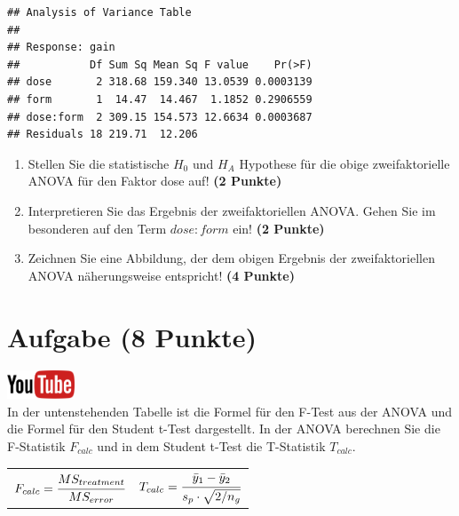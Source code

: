 \documentclass[a4paper, 10pt]{scrartcl}\usepackage[]{graphicx}\usepackage[]{xcolor}
\makeatletter
\newenvironment{kframe}{%
 \def\at@end@of@kframe{}%
 \ifinner\ifhmode%
  \def\at@end@of@kframe{\end{minipage}}%
  \begin{minipage}{\columnwidth}%
 \fi\fi%
 \def\FrameCommand##1{\hskip\@totalleftmargin \hskip-\fboxsep
 \colorbox{shadecolor}{##1}\hskip-\fboxsep
     \hskip-\linewidth \hskip-\@totalleftmargin \hskip\columnwidth}%
 \MakeFramed {\advance\hsize-\width
   \@totalleftmargin\z@ \linewidth\hsize
   \@setminipage}}%
 {\par\unskip\endMakeFramed%
 \at@end@of@kframe}
\newenvironment{knitrout}{}{} %
\makeatother
\begin{document}
\begin{knitrout}
\color{fgcolor}\begin{kframe}
\begin{verbatim}
## Analysis of Variance Table
## 
## Response: gain
##           Df Sum Sq Mean Sq F value    Pr(>F)
## dose       2 318.68 159.340 13.0539 0.0003139
## form       1  14.47  14.467  1.1852 0.2906559
## dose:form  2 309.15 154.573 12.6634 0.0003687
## Residuals 18 219.71  12.206
\end{verbatim}
\end{kframe}
\end{knitrout}

\begin{enumerate}
\item Stellen Sie die statistische $H_0$ und $H_A$ Hypothese f{\"u}r die obige
  zweifaktorielle ANOVA f{\"u}r den Faktor dose
  auf! \textbf{(2 Punkte)}
\item Interpretieren Sie das Ergebnis der zweifaktoriellen ANOVA. Gehen Sie
  im besonderen auf den Term $dose:form$ ein! \textbf{(2 Punkte)}
\item Zeichnen Sie eine Abbildung, der dem obigen Ergebnis der
  zweifaktoriellen ANOVA n{\"a}herungsweise entspricht! \textbf{(4 Punkte)}
\end{enumerate}
 
\clearpage

\section{Aufgabe \hfill (8 Punkte)}


\hfill\href{https://youtu.be/FjjJXkFJfIY}{\includegraphics[width =
  2cm]{img/youtube}}\\[1Ex]


In der untenstehenden Tabelle ist die Formel f{\"u}r den F-Test aus der ANOVA
und die Formel f{\"u}r den Student t-Test dargestellt. In der ANOVA berechnen
Sie die F-Statistik $F_{calc}$ und in dem Student t-Test die T-Statistik
$T_{calc}$.

\begin{center}
  \begin{tabular}{cc}
    $F_{calc} = \cfrac{MS_{treatment}}{MS_{error}}$ & $T_{calc} = \cfrac{\bar{y}_1 - \bar{y}_2}{s_p \cdot \sqrt{2/n_g}}$\\
  \end{tabular}
\end{center}
\end{document}
